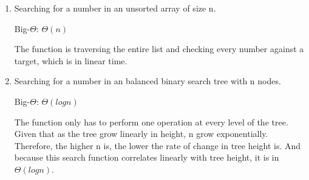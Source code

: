 \documentclass{article}
\begin{document}
\begin{itemize}
\begin{enumerate}
        \item Searching for a number in an unsorted array of size n.

        Big-$\Theta$: $\Theta(n)$

        The function is traversing the entire list and checking every number against a target, which is in linear time.\\

        \item Searching for a number in an balanced binary search tree with n nodes.

        Big-$\Theta$: $\Theta(logn)$

        The function only has to perform one operation at every level of the tree. Given that as the tree grow linearly in height, n grow exponentially. Therefore, the higher n is, the lower the rate of change in tree height is. And because this search function correlates linearly with tree height, it is in $\Theta(logn)$.
    \end{enumerate}
\end{itemize}
\end{document}
